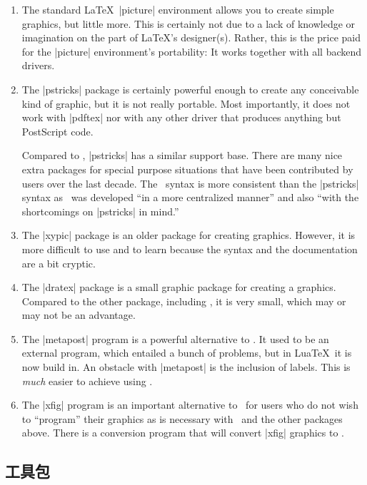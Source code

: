 \begin{enumerate}
\item
  The standard \LaTeX\ |{picture}| environment allows you to create
  simple graphics, but little more. This is certainly not
  due to a lack of knowledge or imagination on the part of
  \LaTeX's designer(s). Rather, this is the price paid for the
  |{picture}| environment's portability: It works together with all
  backend drivers.
\item
  The |pstricks| package is certainly powerful enough to create
  any conceivable kind of graphic, but it is not really portable. Most
  importantly, it does not work with |pdftex| nor with any other
  driver that produces anything but PostScript code.

  Compared to \tikzname, |pstricks| has a similar support base. There
  are many nice extra packages for special purpose situations that have
  been contributed by users over the last decade.
  The \tikzname\ syntax is more consistent than the |pstricks| syntax
  as \tikzname\ was developed ``in a more centralized manner'' and
  also ``with the shortcomings on |pstricks| in mind.''
\item
  The |xypic| package is an older package for creating
  graphics. However, it is more difficult to use and to learn because
  the syntax and the documentation are a bit cryptic.
\item
  The |dratex| package is a small graphic package for creating a
  graphics. Compared to the other package, including \tikzname, it is
  very small, which may or may not be an advantage.
\item
  The |metapost| program is a powerful alternative to
  \tikzname. It used to be an external program, which entailed a
  bunch of problems, but in Lua\TeX\ it is now build in. An obstacle
  with |metapost| is the inclusion of labels. This is \emph{much}
  easier to achieve using \pgfname. 
\item
  The |xfig| program is an important alternative to \tikzname\ for
  users who do not wish to ``program'' their graphics as is necessary
  with \tikzname\ and the other packages above. There is a conversion
  program that will convert |xfig| graphics to \tikzname.
\end{enumerate}


\subsection{工具包}

